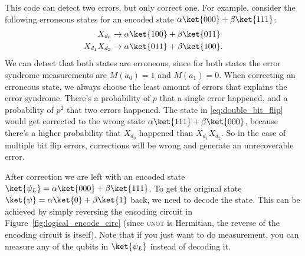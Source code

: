 \documentclass[11pt, notitlepage]{report}
\begin{document}
This code can detect two errors, but only correct one. For example, consider the following erroneous states for an encoded state $\alpha\ket{000} + \beta\ket{111}$:
\begin{align}
  X_{d_0} &\rightarrow \alpha\ket{100} + \beta\ket{011} \label{eq:single_bit_flip} \\
  X_{d_1}X_{d_2} &\rightarrow \alpha\ket{011} + \beta\ket{100}. \label{eq:double_bit_flip}
\end{align}
We can detect that both states are erroneous, since for both states the error syndrome measurements are $M(a_0) = 1$ and $M(a_1) = 0$. When correcting an erroneous state, we always choose the least amount of errors that explains the error syndrome. There's a probability of $p$ that a single error happened, and a probability of $p^2$ that two errors happened. The state in \ref{eq:double_bit_flip} would get corrected to the wrong state $\alpha\ket{111} + \beta\ket{000}$, because there's a higher probability that $X_{d_0}$ happened than $X_{d_1}X_{d_2}$. So in the case of multiple bit flip errors, corrections will be wrong and generate an unrecoverable error.

After correction we are left with an encoded state $\ket{\psi_L} = \alpha\ket{000} + \beta\ket{111}$. To get the original state $\ket{\psi} = \alpha\ket{0} + \beta\ket{1}$ back, we need to decode the state. This can be achieved by simply reversing the encoding circuit in Figure~\ref{fig:logical_encode_circ} (since \textsc{cnot} is Hermitian, the reverse of the encoding circuit is itself). Note that if you just want to do measurement, you can measure any of the qubits in $\ket{\psi_L}$ instead of decoding it.
\end{document}

